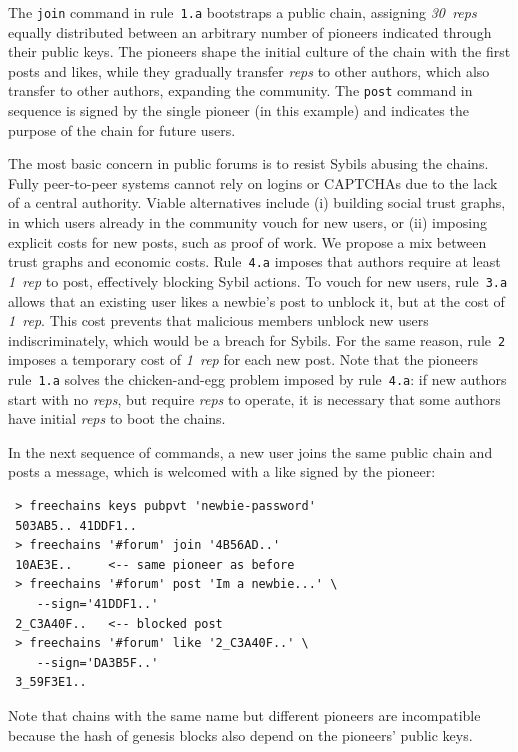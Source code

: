 \documentclass[10pt,journal,compsoc]{IEEEtran}
\newcommand{\reps}     {\emph{reps}\xspace}
\newcommand{\onerep}   {\emph{1~rep}\xspace}
\newcommand{\nreps}[1] {\emph{#1~reps\xspace}}
\newcommand{\code}[1]  {\texttt{\footnotesize{#1}}}
\begin{document}
The \code{join} command in rule~\code{1.a} bootstraps a public chain,
assigning \nreps{30} equally distributed between an arbitrary number of
pioneers indicated through their public keys.
The pioneers shape the initial culture of the chain with the first posts and
likes, while they gradually transfer \reps to other authors, which also
transfer to other authors, expanding the community.
%
The \code{post} command in sequence is signed by the single pioneer (in this
example) and indicates the purpose of the chain for future users.

The most basic concern in public forums is to resist Sybils abusing the
chains.
Fully peer-to-peer systems cannot rely on logins or {\footnotesize CAPTCHAs}
due to the lack of a central authority.
Viable alternatives include (i) building social trust graphs, in which users
already in the community vouch for new users, or (ii) imposing explicit costs
for new posts, such as proof of work.
%
We propose a mix between trust graphs and economic costs.
%
Rule~\code{4.a} imposes that authors require at least \onerep to post,
effectively blocking Sybil actions.
To vouch for new users, rule~\code{3.a} allows that an existing user likes a
newbie's post to unblock it, but at the cost of \onerep.
This cost prevents that malicious members unblock new users indiscriminately,
which would be a breach for Sybils.
For the same reason, rule~\code{2} imposes a temporary cost of \onerep for
each new post.
%
Note that the pioneers rule~\code{1.a} solves the chicken-and-egg problem
imposed by rule~\code{4.a}: if new authors start with no \reps, but require
\reps to operate, it is necessary that some authors have initial \reps to boot
the chains.

In the next sequence of commands, a new user joins the same public chain and
posts a message, which is welcomed with a like signed by the pioneer:

{\footnotesize
\begin{verbatim}
 > freechains keys pubpvt 'newbie-password'
 503AB5.. 41DDF1..
 > freechains '#forum' join '4B56AD..'
 10AE3E..     <-- same pioneer as before
 > freechains '#forum' post 'Im a newbie...' \
    --sign='41DDF1..'
 2_C3A40F..   <-- blocked post
 > freechains '#forum' like '2_C3A40F..' \
    --sign='DA3B5F..'
 3_59F3E1..
\end{verbatim}
}

Note that chains with the same name but different pioneers are incompatible
because the hash of genesis blocks also depend on the pioneers' public keys.
\end{document}
